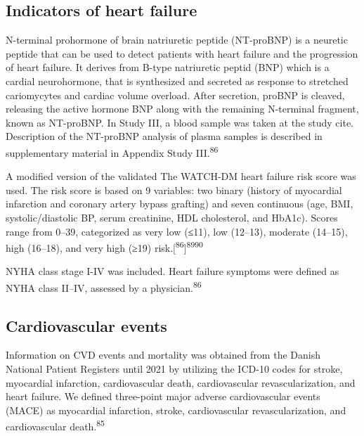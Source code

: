 \documentclass[
  letterpaper,
  headsepline=true,
  open=any]{scrbook}
\begin{document}
\hypertarget{indicators-of-heart-failure}{%
\subsection{Indicators of heart
failure}\label{indicators-of-heart-failure}}

N-terminal prohormone of brain natriuretic peptide (NT-proBNP) is a
neuretic peptide that can be used to detect patients with heart failure
and the progression of heart failure. It derives from B-type natriuretic
peptid (BNP) which is a cardial neurohormone, that is synthesized and
secreted as response to stretched cariomycytes and cardiac volume
overload. After secretion, proBNP is cleaved, releasing the active
hormone BNP along with the remaining N-terminal fragment, known as
NT-proBNP. In Study III, a blood sample was taken at the study cite.
Description of the NT-proBNP analysis of plasma samples is described in
supplementary material in Appendix Study III.\textsuperscript{86}

A modified version of the validated The WATCH-DM heart failure risk
score was used. The risk score is based on 9 variables: two binary
(history of myocardial infarction and coronary artery bypass grafting)
and seven continuous (age, BMI, systolic/diastolic BP, serum creatinine,
HDL cholesterol, and HbA1c). Scores range from 0--39, categorized as
very low (≤11), low (12--13), moderate (14--15), high (16--18), and very
high (≥19)
risk.{[}\textsuperscript{86}{]}\textsuperscript{89}\textsuperscript{90}

NYHA class stage I-IV was included. Heart failure symptoms were defined
as NYHA class II--IV, assessed by a physician.\textsuperscript{86}

\hypertarget{cardiovascular-events}{%
\subsection{Cardiovascular events}\label{cardiovascular-events}}

Information on CVD events and mortality was obtained from the Danish
National Patient Registers until 2021 by utilizing the ICD-10 codes for
stroke, myocardial infarction, cardiovascular death, cardiovascular
revascularization, and heart failure. We defined three-point major
adverse cardiovascular events (MACE) as myocardial infarction, stroke,
cardiovascular revascularization, and cardiovascular
death.\textsuperscript{85}
\end{document}
